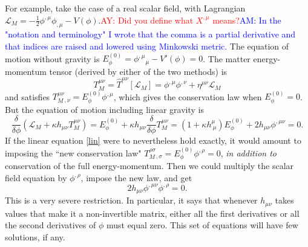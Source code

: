 \documentclass[aps,physrev,preprint,groupedaddress]{revtex4-2}
\newcommand{\AY}[1]{\textcolor{red}{AY: #1}}
\newcommand{\AM}[1]{\textcolor{blue}{AM: #1}}
\begin{document}
For example, take the case of a real scalar field, with Lagrangian \(\mathcal{L}_{M}=-\frac{1}{2}\phi^{,\mu}\phi_{,\mu}-V(\phi)\).\AY{Did you define what $X^{,\mu}$ means?}\AM{In the "notation and terminology" I wrote that the comma is a partial derivative and that indices are raised and lowered using Minkowski metric.} The equation of motion without gravity is \(E_\phi^{(0)}=\phi^{,\mu}{}_\mu-V'(\phi)=0\). The matter energy-momentum tensor (derived by either of the two methods) is 
\begin{equation}
T_M^{\mu\nu}={\widehat{T}}^{\mu\nu}\left\lbrack \mathcal{L}_M \right\rbrack=\phi^{,\mu} \phi^{,\nu}+\eta^{\mu\nu}\mathcal{L}_M
\end{equation}
and satisfies \(T_M^{\mu\nu}{}_{,\nu}=E_\phi^{(0)}\phi^{,\mu}\), which gives the conservation law when \(E_\phi^{(0)}=0\). But the equation of motion including linear gravity is
\begin{equation}
\frac{\delta}{\delta \phi}(\mathcal{L}_M+\kappa h_{\mu\nu}T_M^{\mu\nu})=E_\phi^{(0)}+\kappa h_{\mu\nu}\frac{\delta}{\delta \phi}T_M^{\mu\nu}=(1+\kappa h_{\ \mu}^\mu)E_\phi^{(0)}+2h_{\mu\nu}\phi^{,\mu\nu}=0.
\end{equation}
If the linear equation \eqref{lin} were to nevertheless hold exactly, it would amount to imposing the ``new conservation law" \(T_M^{\rho\sigma}{}_{,\sigma}=E_\phi^{(0)}\phi^{,\rho}=0\), \textit{in addition to} conservation of the full energy-momentum. Then we could multiply the scalar field equation by \(\phi^{,\rho}\), impose the new law, and get
\begin{equation}
2h_{\mu\nu}\phi^{,\mu\nu}\phi^{,\rho}=0.
\end{equation}
This is a very severe restriction. In particular, it says that whenever \(h_{\mu\nu}\) takes values that make it a non-invertible matrix, either all the first derivatives or all the second derivatives of \(\phi\) must equal zero. This set of equations will have few solutions, if any. 
\end{document}
